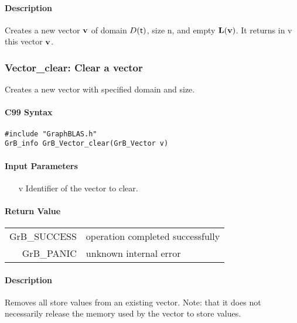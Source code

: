 \paragraph{Description}

Creates a new vector ${\bf v}$ of domain $D({\sf t})$, size {\sf n}, and
empty $\bold{L}({\bf v})$. It returns in {\sf v} this vector ${\bf v}$.


\subsubsection{{\sf Vector\_clear}: Clear a vector}

Creates a new vector with specified domain and size.

\paragraph{C99 Syntax}

\begin{verbatim}
#include "GraphBLAS.h"
GrB_info GrB_Vector_clear(GrB_Vector v)
\end{verbatim}

\paragraph{Input Parameters}

\begin{itemize}
	\item[{\sf v}] Identifier of the vector to clear.
\end{itemize}

\paragraph{Return Value}

\begin{tabular}{rl} 
{\sf GrB\_SUCCESS} 	& operation completed successfully \\
{\sf GrB\_PANIC}	& unknown internal error \\
\end{tabular}

\paragraph{Description}

Removes all store values from an existing vector.  Note: that it does not
necessarily release the memory used by the vector to store values.

